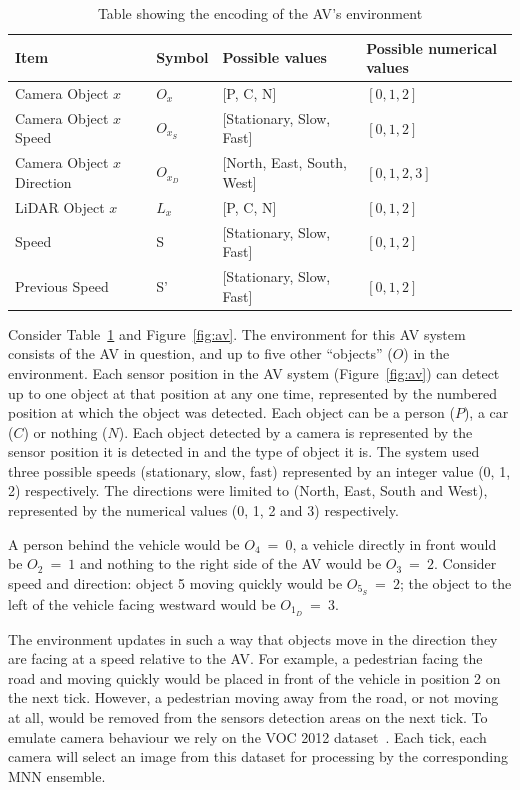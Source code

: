 \begin{table}[t]
	\centering
	\caption{Table showing the encoding of the \ac{AV}'s environment}
	\label{table:encoding}
	\begin{tabular}{|p{}|p{}|p{}|p{}|}
		\hline
		Item & Symbol & Possible values & Possible numerical values \\ \hline
		Camera Object $x$ & $O_x$ & [P, C, N] & $[0, 1, 2]$ \\
		Camera Object $x$ Speed & $O_{x_S}$ & [Stationary, Slow, Fast] & $[0, 1, 2]$ \\
		Camera Object $x$ Direction & $O_{x_D}$ & [North, East, South, West] & $[0, 1, 2, 3]$ \\
		LiDAR Object $x$ & $L_x$ & [P, C, N] & $[0, 1, 2]$ \\
		Speed & S & [Stationary, Slow, Fast] & $[0, 1, 2]$ \\
		Previous Speed & S' & [Stationary, Slow, Fast] & $[0, 1, 2]$ \\
		\hline
	\end{tabular}
\end{table}

Consider Table~\ref{table:encoding} and Figure~\ref{fig:av}.
The environment for this \ac{AV} system consists of the \ac{AV} in question, and up to five other ``objects'' ($O$) in the environment.
Each sensor position in the \ac{AV} system (Figure~\ref{fig:av}) can detect up to one object at that position at any one time, represented by the numbered position at which the object was detected.
Each object can be a person ($P$), a car ($C$) or nothing ($N$).
Each object detected by a camera is represented by the sensor position it is detected in and the type of object it is.
The system used three possible speeds (stationary, slow, fast) represented by an integer value (0, 1, 2) respectively.
The directions were limited to (North, East, South and West), represented by the numerical values (0, 1, 2 and 3) respectively.
\begin{example}
	A person behind the vehicle would be $O_{4}~=~0$, a vehicle directly in front would be $O_{2}~=~1$ and nothing to the right side of the \ac{AV} would be $O_{3}~=~2$.
	Consider speed and direction: object 5 moving quickly would be $O_{5_S}~=~2$; the object to the left of the vehicle facing westward would be $O_{1_D}~=~3$.
\end{example}

The environment updates in such a way that objects move in the direction they are facing at a speed relative to the \ac{AV}.
For example, a pedestrian facing the road and moving quickly would be placed in front of the vehicle in position 2 on the next tick.
However, a pedestrian moving away from the road, or not moving at all, would be removed from the sensors detection areas on the next tick.
To emulate camera behaviour we rely on the \ac{VOC} 2012 dataset~\cite{pascal-voc-2012}.
Each tick, each camera will select an image from this dataset for processing by the corresponding \ac{MNN} ensemble.

